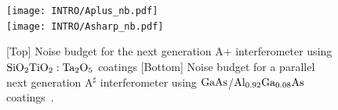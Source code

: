 \begin{figure}[ht!]
    \centering
    \begin{subcaptiongroup}
		\texttt{[image: INTRO/Aplus\_nb.pdf]}
		\\
		\texttt{[image: INTRO/Asharp\_nb.pdf]}
    \end{subcaptiongroup}
    \hfill
    \caption{[Top] Noise budget for the next generation A+ interferometer using $\mathrm{SiO_2}\mathrm{TiO_2:Ta_2O_5}$ coatings [Bottom] Noise budget for a parallel next generation A$^\sharp$ interferometer using $\mathrm{GaAs}$/$\mathrm{Al_{0.92}Ga_{0.08}As}$ coatings~\cite{dcc:asharp}.}
\label{fig:aplusasharp}
\end{figure}


